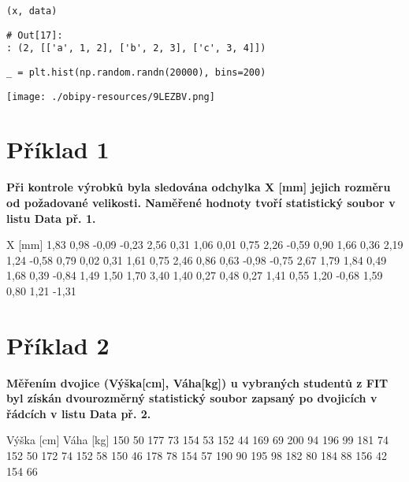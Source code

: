 \documentclass[11pt,titlepage]{article}
\begin{document}
\begin{verbatim}
(x, data)
\end{verbatim}

\begin{verbatim}
# Out[17]:
: (2, [['a', 1, 2], ['b', 2, 3], ['c', 3, 4]])
\end{verbatim}

\begin{verbatim}
_ = plt.hist(np.random.randn(20000), bins=200)
\end{verbatim}

\begin{center}
\texttt{[image: ./obipy-resources/9LEZBV.png]}
\end{center}

\section{Příklad 1}
\label{sec:org6e26c23}
\textbf{Při kontrole výrobků byla sledována odchylka X [mm] jejich rozměru od požadované velikosti.
Naměřené hodnoty tvoří statistický soubor v listu Data př. 1.}

X [mm]
1,83
0,98
-0,09
-0,23
2,56
0,31
1,06
0,01
0,75
2,26
-0,59
0,90
1,66
0,36
2,19
1,24
-0,58
0,79
0,02
0,31
1,61
0,75
2,46
0,86
0,63
-0,98
-0,75
2,67
1,79
1,84
0,49
1,68
0,39
-0,84
1,49
1,50
1,70
3,40
1,40
0,27
0,48
0,27
1,41
0,55
1,20
-0,68
1,59
0,80
1,21
-1,31

\section{Příklad 2}
\label{sec:orgf13985c}
\textbf{Měřením dvojice (Výška[cm], Váha[kg]) u vybraných studentů z FIT byl získán dvourozměrný
statistický soubor zapsaný po dvojicích v řádcích v listu Data př. 2.}

Výška [cm]	Váha [kg]
150	50
177	73
154	53
152	44
169	69
200	94
196	99
181	74
152	50
172	74
152	58
150	46
178	78
154	57
190	90
195	98
182	80
184	88
156	42
154	66
\end{document}
